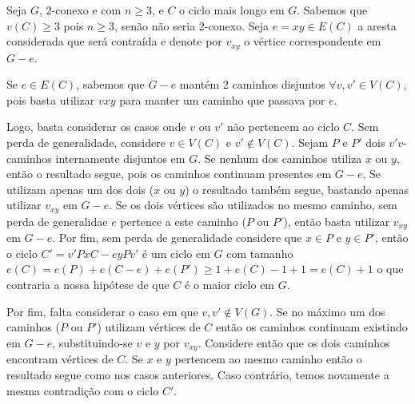 
Seja $G$, 2-conexo e com $n \ge 3$, e $C$ o ciclo mais longo em $G$.
Sabemos que $v(C) \ge 3$ pois $n\ge 3$, senão não seria 2-conexo. 
Seja $e = xy \in E(C)$ a aresta considerada que será contraída 
e denote por $v_{xy}$ o vértice correspondente em $G-e$. 

Se $e\in E(C)$, sabemos que $G-e$  mantém 2 caminhos disjuntos $\forall v,v' \in V(C)$, 
pois basta  utilizar $v{xy}$ para manter um caminho que passava por $e$. 

Logo, basta considerar os casos onde $v$ ou $v'$ não pertencem ao ciclo $C$. 
Sem perda de generalidade, considere $v \in V(C)$ e $v' \notin V(C)$.
Sejam $P$ e $P'$ dois $v'v$-caminhos internamente disjuntos em $G$.
Se nenhum dos caminhos utiliza $x$ ou $y$, então o resultado segue, pois
os caminhos continuam presentes em $G-e$, Se utilizam apenas um dos dois 
($x$ ou $y$) o resultado também segue, bastando apenas utilizar $v_{xy}$
em $G-e$. Se os dois vértices são utilizados no mesmo caminho, sem perda de generalidae $e$ pertence a este caminho ($P$ ou $P'$),
então basta utilizar $v_{xy}$ em $G-e$. Por fim, sem perda de generalidade considere que $x \in P$ e $y \in P'$, 
então o ciclo $C' = v'Px{C-e}yPv'$ é um ciclo em $G$ com tamanho $e(C) = e(P) + e(C - e) + e(P') \ge 1 + e(C) - 1 + 1 = e(C) + 1$
o que contraria a nossa hipótese de que $C$ é o maior ciclo em $G$.

Por fim, falta considerar o caso em que $v,v' \notin V(G)$. 
Se no máximo um dos caminhos ($P$ ou $P'$) utilizam vértices de
$C$ então os caminhos continuam existindo em $G-e$, substituindo-se
$v$ e $y$ por $v_{xy}$. Considere então que os dois caminhos encontram vértices
de $C$. Se $x$ e $y$ pertencem ao mesmo caminho então o resultado segue como nos casos anteriores.
Caso contrário, temos novamente a mesma contradição com o ciclo $C'$.

\fimprova

